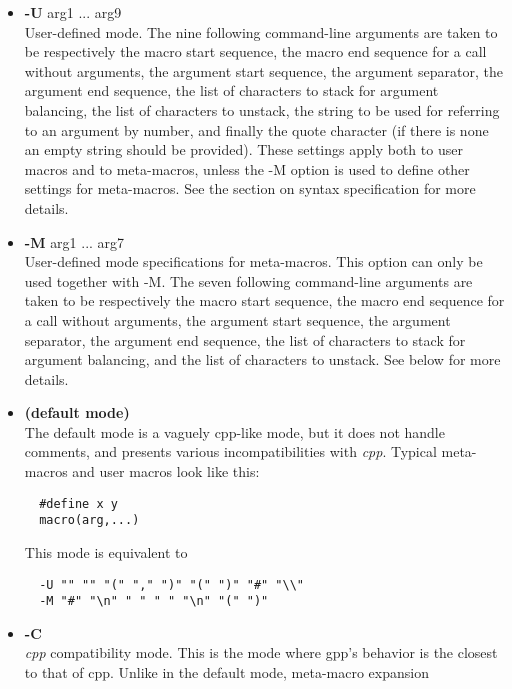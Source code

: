\begin{itemize}
when they occur as the end of a macro call or of a comment. By default, 
when a newline or whitespace character forms the end of a macro or a comment 
it is parsed as part of the macro call or comment and therefore removed from 
output. Use the -n option to keep the last character in the input stream
if it was whitespace or a newline.
\item
{\bf -U } arg1 ... arg9\\
User-defined mode. The nine following command-line arguments are taken to
be respectively the macro start sequence, the macro end sequence for a call
without arguments, the argument start sequence, the argument separator,
the argument end sequence, the list of characters to stack for argument
balancing, the list of characters to unstack, the string to be used for
referring to an argument by number, and finally the quote character (if
there is none an empty string should be provided).
These settings apply both to user macros and to meta-macros, unless the -M
option is used to define other settings for meta-macros. See the section
on syntax specification for more details.
\item
{\bf -M } arg1 ... arg7\\
User-defined mode specifications for meta-macros. This option can only be
used together with -M. The seven following command-line arguments are    
taken to be respectively the macro start sequence, the macro end sequence
for a call without arguments, the argument start sequence, the argument  
separator, the argument end sequence, the list of characters to stack for
argument balancing, and the list of characters to unstack. See below for
more details.
\item
{\bf (default mode)} \\
The default mode is a vaguely cpp-like mode, but it does not handle
comments, and presents various incompatibilities with {\it cpp}.
Typical meta-macros and user macros look like this: \begin{verbatim}
  #define x y
  macro(arg,...)
\end{verbatim}
This mode is equivalent to \begin{verbatim}
  -U "" "" "(" "," ")" "(" ")" "#" "\\"
  -M "#" "\n" " " " " "\n" "(" ")"
\end{verbatim}
\item
{\bf -C} \\
{\it cpp} compatibility mode. This is the mode where gpp's behavior is the
closest to that of cpp. Unlike in the default mode, meta-macro expansion

\end{itemize}
